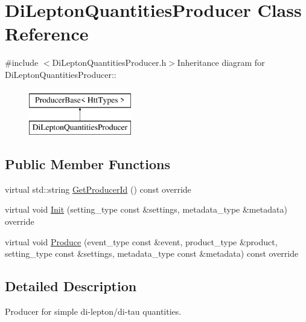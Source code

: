 \hypertarget{classDiLeptonQuantitiesProducer}{
\section{DiLeptonQuantitiesProducer Class Reference}
\label{classDiLeptonQuantitiesProducer}
}


{\ttfamily \#include $<$DiLeptonQuantitiesProducer.h$>$}Inheritance diagram for DiLeptonQuantitiesProducer::\begin{figure}[H]
\begin{center}
\leavevmode
\includegraphics[height=2cm]{classDiLeptonQuantitiesProducer}
\end{center}
\end{figure}
\subsection*{Public Member Functions}
\begin{DoxyCompactItemize}
\item 
virtual std::string \hyperlink{classDiLeptonQuantitiesProducer_a8c3bfed3b572d274df239ecfbc9eede6}{GetProducerId} () const override
\item 
virtual void \hyperlink{classDiLeptonQuantitiesProducer_a7dfd5d81a2fd37836ad99b1589e48981}{Init} (setting\_\-type const \&settings, metadata\_\-type \&metadata) override
\item 
virtual void \hyperlink{classDiLeptonQuantitiesProducer_a595a40c6aa24166f1b5703ce632586f6}{Produce} (event\_\-type const \&event, product\_\-type \&product, setting\_\-type const \&settings, metadata\_\-type const \&metadata) const override
\end{DoxyCompactItemize}


\subsection{Detailed Description}
Producer for simple di-\/lepton/di-\/tau quantities. 

